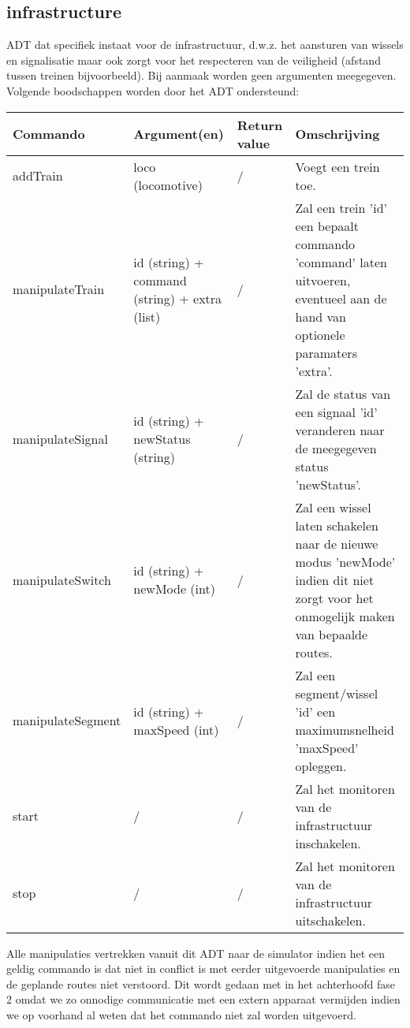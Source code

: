 \documentclass{article}
\begin{document}
\newpage

\subsection{infrastructure}
ADT dat specifiek instaat voor de infrastructuur, d.w.z. het aansturen van wissels en signalisatie maar ook zorgt voor het respecteren van de veiligheid (afstand tussen treinen bijvoorbeeld). Bij aanmaak worden geen argumenten meegegeven.
Volgende boodschappen worden door het ADT ondersteund:
\begin{center}
    \begin{tabular}{ | l | p{4cm} | l | p{6cm} |}
    \hline
    Commando & Argument(en) & Return value & Omschrijving \\ \hline
    addTrain & loco (locomotive) & / & Voegt een trein toe. \\ \hline
    manipulateTrain & id (string) + command (string) + extra (list) & / & Zal een trein 'id' een bepaalt commando 'command' laten uitvoeren, eventueel aan de hand van optionele paramaters 'extra'. \\ \hline
    manipulateSignal & id (string) + newStatus (string) & / & Zal de status van een signaal 'id' veranderen naar de meegegeven status 'newStatus'. \\ \hline
    manipulateSwitch & id (string) + newMode (int) & / & Zal een wissel laten schakelen naar de nieuwe modus 'newMode' indien dit niet zorgt voor het onmogelijk maken van bepaalde routes. \\ \hline
    manipulateSegment & id (string) + maxSpeed (int) & / & Zal een segment/wissel 'id' een maximumsnelheid 'maxSpeed' opleggen. \\ \hline
    start & / & / & Zal het monitoren van de infrastructuur inschakelen. \\ \hline
    stop & / & / & Zal het monitoren van de infrastructuur uitschakelen. \\ \hline
    \end{tabular}
\end{center}
Alle manipulaties vertrekken vanuit dit ADT naar de simulator indien het een geldig commando is dat niet in conflict is met eerder uitgevoerde manipulaties en de geplande routes niet verstoord. Dit wordt gedaan met in het achterhoofd fase 2 omdat we zo onnodige communicatie met een extern apparaat vermijden indien we op voorhand al weten dat het commando niet zal worden uitgevoerd.
\end{document}
